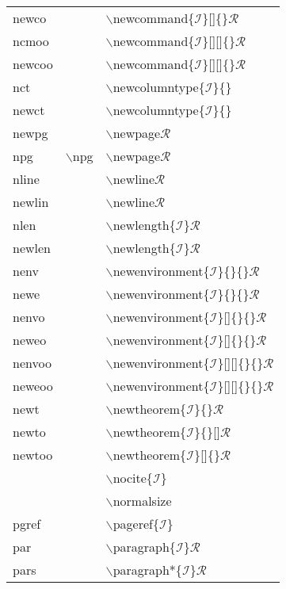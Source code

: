 \begin{longtable}{p{20mm}p{20mm}p{65mm}}
newco &  & $\backslash$newcommand\{$\mathcal{I}$\}[]\{\}$\mathcal{R}$\\
ncmoo &  & $\backslash$newcommand\{$\mathcal{I}$\}[][]\{\}$\mathcal{R}$\\
newcoo &  & $\backslash$newcommand\{$\mathcal{I}$\}[][]\{\}$\mathcal{R}$\\
nct &  & $\backslash$newcolumntype\{$\mathcal{I}$\}\{\}\\
newct &  & $\backslash$newcolumntype\{$\mathcal{I}$\}\{\}\\
newpg &  & $\backslash$newpage$\mathcal{R}$\\
npg & $\backslash$npg & $\backslash$newpage$\mathcal{R}$\\
nline &  & $\backslash$newline$\mathcal{R}$\\
newlin &  & $\backslash$newline$\mathcal{R}$\\
nlen &  & $\backslash$newlength\{$\mathcal{I}$\}$\mathcal{R}$\\
newlen &  & $\backslash$newlength\{$\mathcal{I}$\}$\mathcal{R}$\\
nenv &  & $\backslash$newenvironment\{$\mathcal{I}$\}\{\}\{\}$\mathcal{R}$\\
newe &  & $\backslash$newenvironment\{$\mathcal{I}$\}\{\}\{\}$\mathcal{R}$\\
nenvo &  & $\backslash$newenvironment\{$\mathcal{I}$\}[]\{\}\{\}$\mathcal{R}$\\
neweo &  & $\backslash$newenvironment\{$\mathcal{I}$\}[]\{\}\{\}$\mathcal{R}$\\
nenvoo &  & $\backslash$newenvironment\{$\mathcal{I}$\}[][]\{\}\{\}$\mathcal{R}$\\
neweoo &  & $\backslash$newenvironment\{$\mathcal{I}$\}[][]\{\}\{\}$\mathcal{R}$\\
newt &  & $\backslash$newtheorem\{$\mathcal{I}$\}\{\}$\mathcal{R}$\\
newto &  & $\backslash$newtheorem\{$\mathcal{I}$\}\{\}[]$\mathcal{R}$\\
newtoo &  & $\backslash$newtheorem\{$\mathcal{I}$\}[]\{\}$\mathcal{R}$\\
 &  & $\backslash$nocite\{$\mathcal{I}$\}\\
 &  & $\backslash$normalsize\\
pgref &  & $\backslash$pageref\{$\mathcal{I}$\}\\
par &  & $\backslash$paragraph\{$\mathcal{I}$\}$\mathcal{R}$\\
pars &  & $\backslash$paragraph*\{$\mathcal{I}$\}$\mathcal{R}$\\

\end{longtable}
